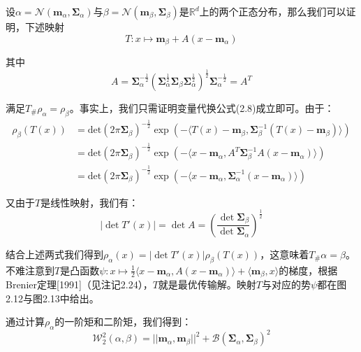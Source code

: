 \documentclass[cn,10pt,math=newtx,citestyle=gb7714-2015,bibstyle=gb7714-2015]{elegantbook}
\begin{document}
\begin{postulate}[正态分布的距离]
设$\alpha=\mathcal{N}(\mathbf{m}_\alpha,\mathbf{\Sigma}_\alpha)$与$\beta=\mathcal{N}(\mathbf{m}_\beta,\mathbf{\Sigma}_\beta)$是$\mathbb{R}^d$上的两个正态分布，那么我们可以证明，下述映射
\begin{equation}
    \label{2.40}
    T:x\mapsto \mathbf{m}_\beta+A(x-\mathbf{m}_\alpha)
\end{equation}

其中
\begin{equation*}
    A=\mathbf{\Sigma}_\alpha^{-\frac{1}{2}}\left( \mathbf{\Sigma}_\alpha^{\frac{1}{2}} \mathbf{\Sigma}_\beta \mathbf{\Sigma}_\alpha^{\frac{1}{2}} \right)^{\frac{1}{2}} \mathbf{\Sigma}_\alpha^{-\frac{1}{2}} = A^T
\end{equation*}

满足$T_\#\rho_\alpha=\rho_\beta$。事实上，我们只需证明变量代换公式(2.8)成立即可。由于：
\begin{align*}
    \rho_\beta(T(x)) &= \text{det}(2\pi\mathbf{\Sigma}_\beta)^{-\frac{1}{2}}\exp{(-\langle T(x)-\mathbf{m}_\beta, \mathbf{\Sigma}_\beta^{-1}(T(x)-\mathbf{m}_\beta) \rangle)}\\
    &= \text{det}(2\pi\mathbf{\Sigma}_\beta)^{-\frac{1}{2}}\exp{(-\langle x-\mathbf{m}_\alpha, A^T\mathbf{\Sigma}_\beta^{-1} A(x-\mathbf{m}_\alpha) \rangle)}\\
    &= \text{det}(2\pi\mathbf{\Sigma}_\beta)^{-\frac{1}{2}}\exp{(-\langle x-\mathbf{m}_\alpha, \mathbf{\Sigma}_\alpha^{-1} (x-\mathbf{m}_\alpha) \rangle)}
\end{align*}

又由于$T$是线性映射，我们有：
\begin{equation*}
    |\det T'(x)| = \det A = \left(\frac{\det \mathbf{\Sigma}_\beta}{\det \mathbf{\Sigma}_\alpha}\right)^{\frac{1}{2}}
\end{equation*}

结合上述两式我们得到$\rho_\alpha(x) = |\det T'(x)|\rho_\beta(T(x))$，这意味着$T_\#\alpha=\beta$。不难注意到$T$是凸函数$\psi:x\mapsto \frac{1}{2}\langle x-\mathbf{m}_\alpha,A(x-\mathbf{m}_\alpha)\rangle + \langle \mathbf{m}_\beta, x\rangle$的梯度，根据Brenier定理[1991]（见注记2.24），$T$就是最优传输解。映射$T$与对应的势$\psi$都在图2.12与图2.13中给出。

通过计算$\rho_\alpha$的一阶矩和二阶矩，我们得到：
\begin{equation}
    \label{2.41}
    \mathcal{W}_2^2(\alpha,\beta) = ||\mathbf{m}_\alpha,\mathbf{m}_\beta||^2 + \mathcal{B}(\mathbf{\Sigma}_\alpha,\mathbf{\Sigma}_\beta)^2
\end{equation}


\end{postulate}
\end{document}
